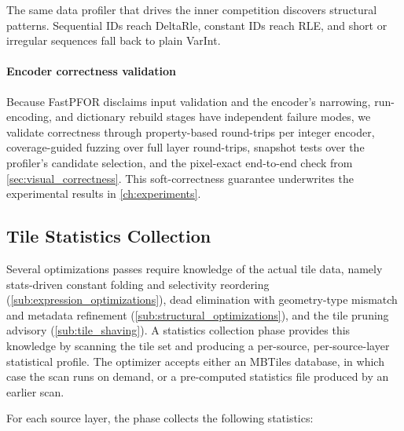 {The same data profiler that drives the inner competition discovers structural patterns.
Sequential IDs reach DeltaRle, constant IDs reach \ac{RLE}, and short or irregular sequences fall back to plain \ac{VarInt}.

\paragraph{Encoder correctness validation}\label{par:encoder_validation}
Because \ac{FastPFOR} disclaims input validation and the encoder's narrowing, run-encoding, and dictionary rebuild stages have independent failure modes, we validate correctness through property-based round-trips per integer encoder, coverage-guided fuzzing over full layer round-trips, snapshot tests over the profiler's candidate selection, and the pixel-exact end-to-end check from \cref{sec:visual_correctness}.
This soft-correctness guarantee underwrites the experimental results in \cref{ch:experiments}.

\subsection{Tile Statistics Collection}\label{sub:tile_statistics}

Several optimizations passes require knowledge of the actual tile data, namely stats-driven constant folding and selectivity reordering (\cref{sub:expression_optimizations}), dead elimination with geometry-type mismatch and metadata refinement (\cref{sub:structural_optimizations}), and the tile pruning advisory (\cref{sub:tile_shaving}).
A statistics collection phase provides this knowledge by scanning the tile set and producing a per-source, per-source-layer statistical profile.
The optimizer accepts either an MBTiles database, in which case the scan runs on demand, or a pre-computed statistics file produced by an earlier scan.

For each source layer, the phase collects the following statistics:

}
